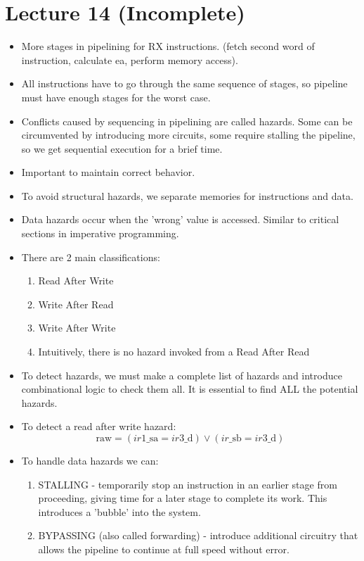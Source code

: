 \documentclass{article}
\begin{document}
\section*{Lecture 14 (Incomplete)}
\begin{itemize}
\item More stages in pipelining for RX instructions. (fetch second word of instruction, calculate ea, perform memory access).
\item All instructions have to go through the same sequence of stages, so pipeline must have enough stages for the worst case.
\item Conflicts caused by sequencing in pipelining are called hazards. Some can be circumvented by introducing more circuits, some require stalling the pipeline, so we get sequential execution for a brief time.
\item Important to maintain correct behavior.
\item To avoid structural hazards, we separate memories for instructions and data.
\item Data hazards occur when the 'wrong' value is accessed. Similar to critical sections in imperative programming.
\item There are 2 main classifications:
\begin{enumerate}
\item Read After Write
\item Write After Read
\item Write After Write
\item Intuitively, there is no hazard invoked from a Read After Read
\end{enumerate}
\item To detect hazards, we must make a complete list of hazards and introduce combinational logic to check them all. It is essential to find ALL the potential hazards.
\item To detect a read after write hazard:
\[ \text{raw} = (ir1\text{\_sa} = ir3\text{\_d}) \lor (ir\text{\_sb} = ir3\text{\_d}) \]
\item To handle data hazards we can:
\begin{enumerate}
\item STALLING - temporarily stop an instruction in an earlier stage from proceeding, giving time for a later stage to complete its work. This introduces a 'bubble' into the system.
\item BYPASSING (also called forwarding) - introduce additional circuitry that allows the pipeline to continue at full speed without error.

\end{enumerate}
\end{itemize}
\end{document}
